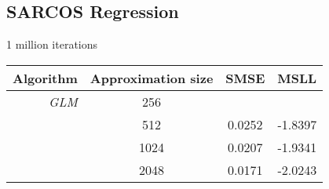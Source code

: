 \documentclass[11pt, oneside]{article}
\begin{document}
\subsection{SARCOS Regression}

1 million iterations

\begin{table}[htb]

    \centering
    \begin{tabular}{r|c|c c}
        \textbf{Algorithm} & \textbf{Approximation size} & \textbf{SMSE} &
        \textbf{MSLL} \\
        \hline
        \emph{GLM} & 256 & & \\
        & 512 & 0.0252 & -1.8397 \\
        & 1024 & 0.0207 & -1.9341 \\
        & 2048 & 0.0171 & -2.0243 \\
        \hline
    \end{tabular}

\end{table}


\end{document}
